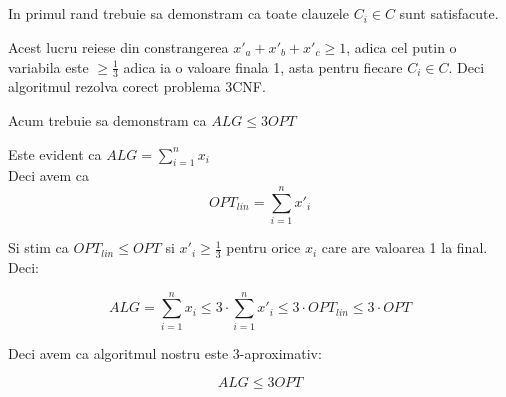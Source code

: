 \documentclass[a4paper]{report}
\begin{document}
\subsection{}

In primul rand trebuie sa demonstram ca toate clauzele $C_{i}\in C$ sunt satisfacute.

Acest lucru reiese din constrangerea $x'_{a}+x'_{b}+x'_{c}\geq 1$, adica cel putin o variabila este $\geq \frac{1}{3}$
adica ia o valoare finala 1, asta pentru fiecare $C_{i}\in C$. Deci algoritmul rezolva corect problema 3CNF.

Acum trebuie sa demonstram ca $ALG\leq 3OPT$

Este evident ca $ALG=\sum_{i=1}^{n}x_{i}$\\

Deci avem ca \[OPT_{lin}=\sum_{i=1}^{n}x'_{i}\]

Si stim ca $OPT_{lin}\leq OPT$ si $x'_{i}\geq \frac{1}{3}$ pentru orice $x_{i}$ care are valoarea 1 la final. Deci:

\[ALG=\sum_{i=1}^{n}x_{i}\leq 3\cdot \sum_{i=1}^{n}x'_{i}\leq 3\cdot OPT_{lin} \leq 3\cdot OPT\]

Deci avem ca algoritmul nostru este 3-aproximativ:

\[ALG\leq 3OPT\]
\end{document}
